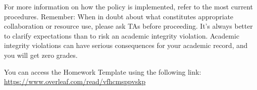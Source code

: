 \documentclass[11pt,letterpaper]{article}
\begin{document}
\begin{enumerate}
{\begin{minipage}{0.95\textwidth}
\begin{enumerate}
    For more information on how the policy is implemented, refer to the most current procedures. Remember: When in doubt about what constitutes appropriate collaboration or resource use, please ask TAs before proceeding. It's always better to clarify expectations than to risk an academic integrity violation. Academic integrity violations can have serious consequences for your academic record, and you will get zero grades.
\end{enumerate}



You can access the Homework Template using the following link: \url{https://www.overleaf.com/read/vfhcmsppvskp}

\end{minipage}}
\end{enumerate}
\end{document}
